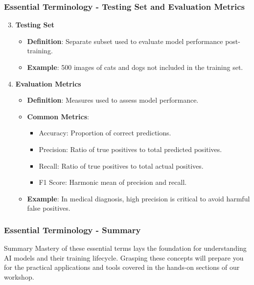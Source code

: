 \documentclass{beamer}
\begin{document}
\begin{frame}[fragile]
    \frametitle{Essential Terminology - Testing Set and Evaluation Metrics}
    \begin{enumerate}
        \setcounter{enumi}{2}
        \item \textbf{Testing Set}
        \begin{itemize}
            \item \textbf{Definition}: Separate subset used to evaluate model performance post-training.
            \item \textbf{Example}: 500 images of cats and dogs not included in the training set.
        \end{itemize}
        
        \item \textbf{Evaluation Metrics}
        \begin{itemize}
            \item \textbf{Definition}: Measures used to assess model performance.
            \item \textbf{Common Metrics}:
            \begin{itemize}
                \item Accuracy: Proportion of correct predictions.
                \item Precision: Ratio of true positives to total predicted positives.
                \item Recall: Ratio of true positives to total actual positives.
                \item F1 Score: Harmonic mean of precision and recall.
            \end{itemize}
            \item \textbf{Example}: In medical diagnosis, high precision is critical to avoid harmful false positives.
        \end{itemize}
    \end{enumerate}
\end{frame}

\begin{frame}[fragile]
    \frametitle{Essential Terminology - Summary}
    \begin{block}{Summary}
        Mastery of these essential terms lays the foundation for understanding AI models and their training lifecycle. Grasping these concepts will prepare you for the practical applications and tools covered in the hands-on sections of our workshop.
    \end{block}
\end{frame}
\end{document}
